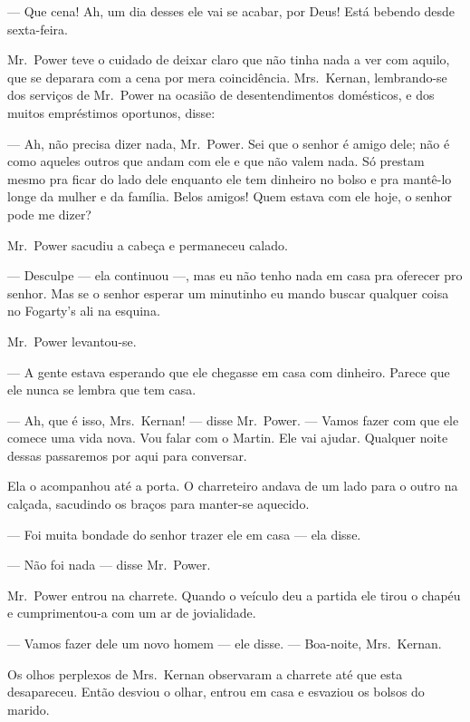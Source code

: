 --- Que cena!  Ah, um dia desses ele vai se acabar, por Deus!  Está bebendo
desde sexta-feira.

Mr.~Power teve o cuidado de deixar claro que não tinha nada a ver com aquilo,
que se deparara com a cena por mera coincidência.  Mrs.~Kernan, lembrando-se
dos serviços de Mr.~Power na ocasião de desentendimentos domésticos, e dos
muitos empréstimos oportunos, disse:

--- Ah, não precisa dizer nada, Mr.~Power.  Sei que o senhor é amigo dele; não
é como aqueles outros que andam com ele e que não valem nada.  Só prestam mesmo
pra ficar do lado dele enquanto ele tem dinheiro no bolso e pra mantê-lo longe
da mulher e da família.  Belos amigos!  Quem estava com ele hoje, o senhor pode
me dizer?

Mr.~Power sacudiu a cabeça e permaneceu calado.

--- Desculpe --- ela continuou ---, mas eu não tenho nada em casa pra
oferecer pro senhor.  Mas se o senhor esperar um minutinho eu mando buscar
qualquer coisa no Fogarty’s ali na esquina.

Mr.~Power levantou-se.

--- A gente estava esperando que ele chegasse em casa com dinheiro.  Parece que
ele nunca se lembra que tem casa.

--- Ah, que é isso, Mrs.~Kernan! --- disse Mr.~Power.  --- Vamos fazer com que
ele comece uma vida nova.  Vou falar com o Martin.  Ele vai ajudar.  Qualquer
noite dessas passaremos por aqui para conversar.

Ela o acompanhou até a porta.  O charreteiro andava de um lado para o outro na
calçada, sacudindo os braços para manter-se aquecido.

--- Foi muita bondade do senhor trazer ele em casa --- ela disse.

--- Não foi nada --- disse Mr.~Power.

Mr.~Power entrou na charrete.  Quando o veículo deu a partida ele tirou o
chapéu e cumprimentou-a com um ar de jovialidade.

--- Vamos fazer dele um novo homem --- ele disse.  --- Boa-noite, Mrs.~Kernan.

\smallskip

\noindent\dotfill

\smallskip

Os olhos perplexos de Mrs.~Kernan observaram a charrete até que esta
desapareceu.  Então desviou o olhar, entrou em casa e esvaziou os bolsos do
marido.


